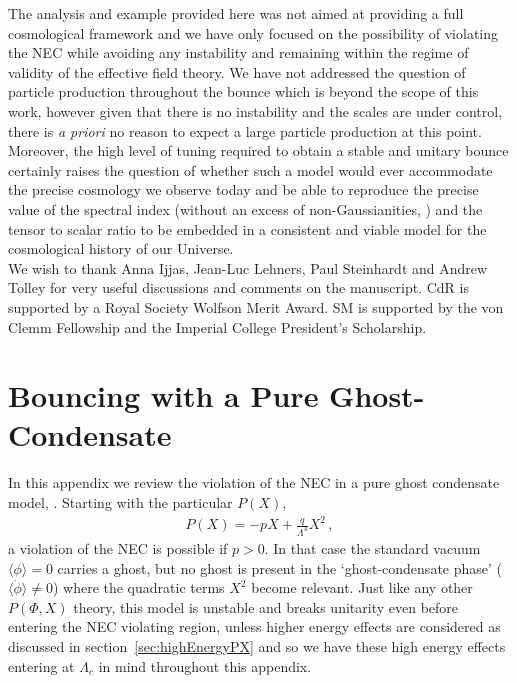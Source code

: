 \documentclass[12pt]{article}
\def\ba{\begin{eqnarray}}
\def\ea{\end{eqnarray}}
\begin{document}
The analysis and example provided here was not aimed at providing a full cosmological framework and we have only focused on the possibility of violating the NEC while avoiding any instability and remaining within the regime of validity of the effective field theory. We have not addressed the question of particle production throughout the bounce which is beyond the scope of this work, however given that there is no instability and the scales are under control, there is {\it a priori} no reason to expect a large particle production at this point.
Moreover, the high level of tuning required to obtain a stable and unitary bounce certainly raises the question of whether such a model would ever accommodate the precise cosmology we observe today and be able to reproduce the precise value of the spectral index (without an excess of non-Gaussianities, \cite{Gao:2014eaa}) and the tensor to scalar ratio to be embedded in a consistent and viable model for the cosmological history of our Universe.  \\


%
We wish to thank Anna Ijjas, Jean-Luc Lehners,  Paul Steinhardt and  Andrew Tolley  for very useful discussions and comments on the manuscript.
CdR is supported by a Royal Society Wolfson Merit Award. SM is supported by the von Clemm Fellowship and the Imperial College President's Scholarship.\vspace{1cm}


\appendix




\section{Bouncing with a Pure Ghost-Condensate}
\label{App:GC}

In this appendix we review the violation of the NEC in a pure ghost condensate model, \cite{ArkaniHamed:2003uy,Creminelli:2006xe,Buchbinder:2007ad,Koehn:2015vvy}.
Starting with the particular $P(X)$,
\ba
\label{eq:GhostCond}
P(X)=-p X + \frac{q}{\Lambda^4} X^2\,,
\ea
a violation of the NEC is possible if $p>0$. In that case the standard vacuum $\langle \phi \rangle = 0$ carries a ghost, but no ghost is present in  the `ghost-condensate phase' ($\langle \dot \phi \rangle \ne 0$) where the quadratic terms $X^2$ become relevant. Just like any other $P(\Phi, X)$ theory, this model is unstable and breaks unitarity even before entering the NEC violating region, unless higher energy effects are considered as discussed in section~\ref{sec:highEnergyPX} and so we have these high energy effects entering at $\Lambda_c$ in mind throughout this appendix. \\
\end{document}
